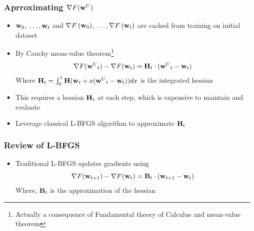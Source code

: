 \documentclass[pdf]{beamer}
\begin{document}
\begin{frame}
  \frametitle{Aprroximating $\nabla F({\textbf{w}^{U}})$}
  \begin{itemize}
    \item<1-> $\textbf{w}_{0}$, $\dots,\textbf{w}_{t}$ and $\nabla F\left(\textbf{w}_{0}\right)$, $\dots, \nabla F\left(\textbf{w}_{t}\right)$ are cached from training on initial dataset
    \item<2-> By Cauchy mean-value theorem\footnote<3->{Actually a consequence of Fundamental theory of Calculus and mean-value theorem}
    \[
      \nabla F({\textbf{w}^{U}}_{t}) - \nabla F(\textbf{w}_{t}) = \textbf{H}_{t} \cdot ({\textbf{w}^{U}}_{t} - \textbf{w}_{t}) 
    \]
    Where $\textbf{H}_{t} = \int_{0}^{1}\textbf{H}(\textbf{w}_{t}+x({\textbf{w}^{U}}_{t}-\textbf{w}_{t}))dx$ is the integrated hessian
    \item<4-> This requires a hessian $\textbf{H}_{t}$ at each step, which is expensive to maintain and evaluate
    \item<5-> Leverage classical L-BFGS algorithm to approximate $\textbf{H}_{t}$
  \end{itemize}
\end{frame}

\begin{frame}
  \frametitle{Review of L-BFGS}
  \begin{itemize}
    \item Traditional L-BFGS updates gradients using
    \[\nabla F(\textbf{w}_{t+1}) - \nabla F(\textbf{w}_{t})  = \textbf{B}_{t} \cdot (\textbf{w}_{t+1}-\textbf{w}_{t}) \]
    Where, $\textbf{B}_t$ is the approximation of the hessian
  \end{itemize}
  \vfill
\end{frame}
\end{document}
